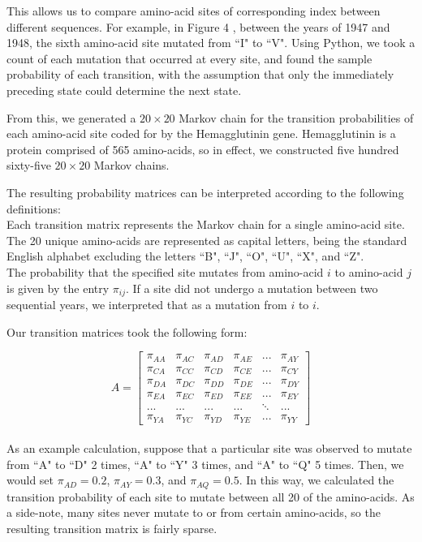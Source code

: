 \documentclass[12pt]{article}
\begin{document}
\begin{multicols}{2}
This allows us to compare amino-acid sites of corresponding index between different sequences. For example, in Figure 4 , between the years of 1947 and 1948, the sixth amino-acid site mutated from ``I" to ``V". Using Python, we took a count of each mutation that occurred at every site, and found the sample probability of each transition, with the assumption that only the immediately preceding state could determine the next state.

From this, we generated a $20 \times 20$ Markov chain for the transition probabilities of each amino-acid site coded for by the Hemagglutinin gene. Hemagglutinin is a protein comprised of 565 amino-acids, so in effect, we constructed five hundred sixty-five $20 \times 20$ Markov chains.

The resulting probability matrices can be interpreted according to the following definitions: \\
\textbullet{} Each transition matrix represents the Markov chain for a single amino-acid site. \\
\textbullet{} The 20 unique amino-acids are represented as capital letters, being the standard English alphabet excluding the letters ``B", ``J", ``O", ``U", ``X", and ``Z". \\
\textbullet{} The probability that the specified site mutates from amino-acid $i$ to amino-acid $j$ is given by the entry $\pi_{ij}$. If a site did not undergo a mutation between two sequential years, we interpreted that as a mutation from $i$ to $i$.

Our transition matrices took the following form:

\[
    A =
        \begin{bmatrix}
            \pi_{AA} & \pi_{AC} & \pi_{AD} & \pi_{AE} &... & \pi_{AY}\\
            \pi_{CA} & \pi_{CC} & \pi_{CD} & \pi_{CE} &... & \pi_{CY}\\
            \pi_{DA} & \pi_{DC} & \pi_{DD} & \pi_{DE} &... & \pi_{DY}\\
            \pi_{EA} & \pi_{EC} & \pi_{ED} & \pi_{EE} &... & \pi_{EY}\\
            ... & ... & ... & ... &\ddots & ... \\
            \pi_{YA} & \pi_{YC} & \pi_{YD} & \pi_{YE} &... & \pi_{YY}
        \end{bmatrix}
\]\\

As an example calculation, suppose that a particular site was observed to mutate from ``A" to ``D" 2 times, ``A" to ``Y" 3 times, and ``A" to ``Q" 5 times. Then, we would set $\pi_{AD} = 0.2$, $\pi_{AY} = 0.3$, and $\pi_{AQ} = 0.5$. In this way, we calculated the transition probability of each site to mutate between all 20 of the amino-acids. As a side-note, many sites never mutate to or from certain amino-acids, so the resulting transition matrix is fairly sparse.


\end{multicols}
\end{document}
